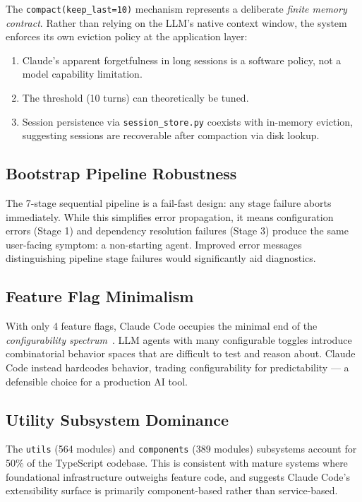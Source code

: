 \documentclass[conference]{IEEEtran}
\begin{document}
The \texttt{compact(keep\_last=10)} mechanism represents a deliberate
\emph{finite memory contract}. Rather than relying on the LLM's native
context window, the system enforces its own eviction policy at the
application layer:

\begin{enumerate}
  \item Claude's apparent forgetfulness in long sessions is a software
        policy, not a model capability limitation.
  \item The threshold (10 turns) can theoretically be tuned.
  \item Session persistence via \texttt{session\_store.py} coexists
        with in-memory eviction, suggesting sessions are recoverable
        after compaction via disk lookup.
\end{enumerate}

\subsection{Bootstrap Pipeline Robustness}

The 7-stage sequential pipeline is a fail-fast design: any stage
failure aborts immediately. While this simplifies error propagation,
it means configuration errors (Stage 1) and dependency resolution
failures (Stage 3) produce the same user-facing symptom: a
non-starting agent. Improved error messages distinguishing pipeline
stage failures would significantly aid diagnostics.

\subsection{Feature Flag Minimalism}

With only 4 feature flags, Claude Code occupies the minimal end of
the \emph{configurability spectrum}~\cite{neri2013software}. LLM
agents with many configurable toggles introduce combinatorial
behavior spaces that are difficult to test and reason about. Claude
Code instead hardcodes behavior, trading configurability for
predictability --- a defensible choice for a production AI tool.

\subsection{Utility Subsystem Dominance}

The \texttt{utils} (564 modules) and \texttt{components} (389
modules) subsystems account for 50\% of the TypeScript codebase.
This is consistent with mature systems where foundational
infrastructure outweighs feature code, and suggests Claude Code's
extensibility surface is primarily component-based rather than
service-based.
\end{document}
